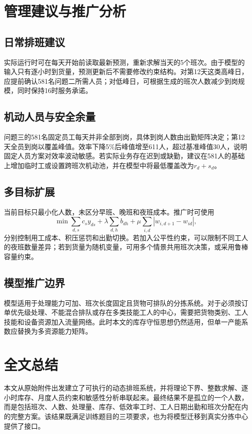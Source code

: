 \section{管理建议与推广分析}

\subsection{日常排班建议}

实际运行时可在每天开始前读取最新预测，重新求解当天的5个班次。由于模型的输入只有逐小时到货量，预测更新后不需要修改约束结构。对第12天这类高峰日，应提前确认581名问题二所需人员；对低峰日，可根据生成的班次人数减少到岗规模，同时保持16时服务承诺。

\subsection{机动人员与安全余量}

问题三的581名固定员工每天并非全部到岗，具体到岗人数由出勤矩阵决定；第12天全员到岗以覆盖峰值。效率下降5\%后峰值增至611人，超过基准峰值30人，说明固定人员方案对效率波动敏感。若实际业务存在迟到或缺勤，建议在581人的基础上增加临时工或设置跨班次机动池，并在模型中将最低覆盖改为$r_d+s_d$。

\subsection{多目标扩展}

当前目标只最小化人数，未区分早班、晚班和夜班成本。推广时可使用
\begin{equation}
\min\sum_{d,s}c_s y_{ds}+\lambda\sum_{d,h}b_{dh}+\mu\sum_{i,d}|w_{i,d+1}-w_{id}|,
\end{equation}
分别控制用工成本、积压惩罚和出勤切换。若加入公平性约束，可以限制不同工人的夜班数量差异；若到货量为随机变量，可用多个情景共用班次决策，或采用鲁棒容量约束。

\subsection{模型推广边界}

模型适用于处理能力可加、班次长度固定且货物可排队的分拣系统。对于必须按订单优先级处理、不能混合排队或存在多类技能工人的中心，需要把货物类别、工人技能和设备资源加入流量网络。此时本文的库存守恒思想仍然适用，但单一产能系数应替换为多资源能力矩阵。

\section{全文总结}

本文从原始附件出发建立了可执行的动态排班系统，并将理论下界、整数求解、逐小时库存、月度人员约束和敏感性分析串联起来。最终结果不是孤立的一个人数，而是包括班次、人数、处理量、库存、低效率工时、工人日期出勤和班次分配在内的完整方案。该结果既满足训练题目的三项要求，也为将模型迁移到真实分拣中心提供了接口。
